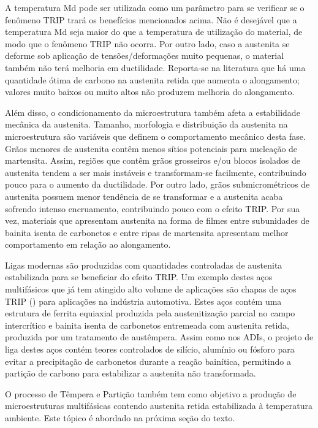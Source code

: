 A temperatura Md pode ser utilizada como um parâmetro para se verificar se o fenômeno TRIP trará os benefícios mencionados acima. Não é desejável que a temperatura Md seja maior do que a temperatura de utilização do material, de modo que o fenômeno TRIP não ocorra. Por outro lado, caso a austenita se deforme sob aplicação de tensões/deformações muito pequenas, o material também não terá melhoria em ductilidade. Reporta-se na literatura que há uma quantidade ótima de carbono na austenita retida que aumenta o alongamento; valores muito baixos ou muito altos não produzem melhoria do alongamento\cite{Reisner1997,Meyer1999}.

Além disso, o condicionamento da microestrutura também afeta a estabilidade mecânica da austenita. Tamanho, morfologia e distribuição da austenita na microestrutura são variáveis que definem o comportamento mecânico desta fase\cite{Timokhina2004}. Grãos menores de austenita contêm menos sítios potenciais para nucleação de martensita. Assim, regiões que contêm grãos grosseiros e/ou blocos isolados de austenita tendem a ser mais instáveis e transformam-se facilmente, contribuindo pouco para o aumento da ductilidade. Por outro lado, grãos submicrométricos de austenita possuem menor tendência de se transformar e a austenita acaba sofrendo intenso encruamento, contribuindo pouco com o efeito TRIP\cite{Bai1998}. Por sua vez, materiais que apresentam austenita na forma de filmes entre subunidades de bainita isenta de carbonetos e entre ripas de martensita apresentam melhor comportamento em relação ao alongamento\cite{Takahashi1991,Xiong2013}.

Ligas modernas são produzidas com quantidades controladas de austenita estabilizada para se beneficiar do efeito TRIP. Um exemplo destes aços multifásicos que já tem atingido alto volume de aplicações são chapas de aços TRIP () para aplicações na indústria automotiva. Estes aços contém uma estrutura de ferrita equiaxial produzida pela austenitização parcial no campo intercrítico e bainita isenta de carbonetos entremeada com austenita retida, produzida por um tratamento de austêmpera. Assim como nos ADIs, o projeto de liga destes aços contém teores controlados de silício, alumínio ou fósforo para evitar a precipitação de carbonetos durante a reação bainítica, permitindo a partição de carbono para estabilizar a austenita não transformada\cite{DeCooman2004,Honeycombe2006}.

O processo de Têmpera e Partição também tem como objetivo a produção de microestruturas multifásicas contendo austenita retida estabilizada à temperatura ambiente. Este tópico é abordado na próxima seção do texto.

